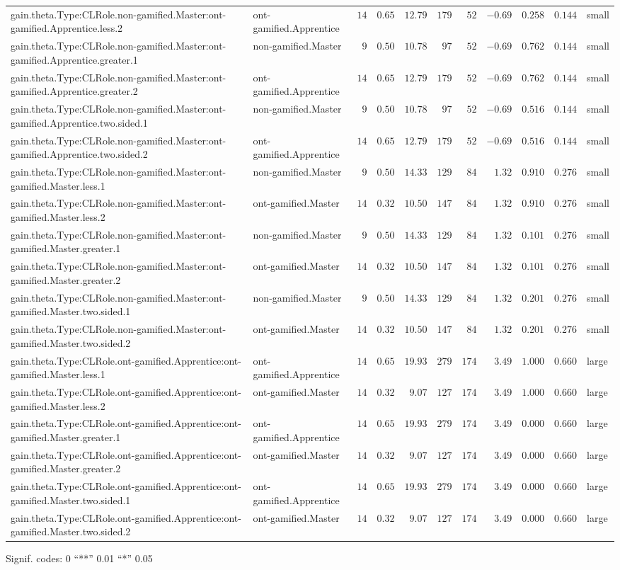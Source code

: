 \documentclass[6pt]{article}
\begin{document}
\begin{landscape}
{\begin{longtable}{llrrrrrrrrl}
gain.theta.Type:CLRole.non-gamified.Master:ont-gamified.Apprentice.less.2&ont-gamified.Apprentice&$14$&$0.65$&$12.79$&$179$&$ 52$&$-0.69$&$0.258$&$0.144$&small\tabularnewline
gain.theta.Type:CLRole.non-gamified.Master:ont-gamified.Apprentice.greater.1&non-gamified.Master&$ 9$&$0.50$&$10.78$&$ 97$&$ 52$&$-0.69$&$0.762$&$0.144$&small\tabularnewline
gain.theta.Type:CLRole.non-gamified.Master:ont-gamified.Apprentice.greater.2&ont-gamified.Apprentice&$14$&$0.65$&$12.79$&$179$&$ 52$&$-0.69$&$0.762$&$0.144$&small\tabularnewline
gain.theta.Type:CLRole.non-gamified.Master:ont-gamified.Apprentice.two.sided.1&non-gamified.Master&$ 9$&$0.50$&$10.78$&$ 97$&$ 52$&$-0.69$&$0.516$&$0.144$&small\tabularnewline
gain.theta.Type:CLRole.non-gamified.Master:ont-gamified.Apprentice.two.sided.2&ont-gamified.Apprentice&$14$&$0.65$&$12.79$&$179$&$ 52$&$-0.69$&$0.516$&$0.144$&small\tabularnewline
gain.theta.Type:CLRole.non-gamified.Master:ont-gamified.Master.less.1&non-gamified.Master&$ 9$&$0.50$&$14.33$&$129$&$ 84$&$ 1.32$&$0.910$&$0.276$&small\tabularnewline
gain.theta.Type:CLRole.non-gamified.Master:ont-gamified.Master.less.2&ont-gamified.Master&$14$&$0.32$&$10.50$&$147$&$ 84$&$ 1.32$&$0.910$&$0.276$&small\tabularnewline
gain.theta.Type:CLRole.non-gamified.Master:ont-gamified.Master.greater.1&non-gamified.Master&$ 9$&$0.50$&$14.33$&$129$&$ 84$&$ 1.32$&$0.101$&$0.276$&small\tabularnewline
gain.theta.Type:CLRole.non-gamified.Master:ont-gamified.Master.greater.2&ont-gamified.Master&$14$&$0.32$&$10.50$&$147$&$ 84$&$ 1.32$&$0.101$&$0.276$&small\tabularnewline
gain.theta.Type:CLRole.non-gamified.Master:ont-gamified.Master.two.sided.1&non-gamified.Master&$ 9$&$0.50$&$14.33$&$129$&$ 84$&$ 1.32$&$0.201$&$0.276$&small\tabularnewline
gain.theta.Type:CLRole.non-gamified.Master:ont-gamified.Master.two.sided.2&ont-gamified.Master&$14$&$0.32$&$10.50$&$147$&$ 84$&$ 1.32$&$0.201$&$0.276$&small\tabularnewline
gain.theta.Type:CLRole.ont-gamified.Apprentice:ont-gamified.Master.less.1&ont-gamified.Apprentice&$14$&$0.65$&$19.93$&$279$&$174$&$ 3.49$&$1.000$&$0.660$&large\tabularnewline
gain.theta.Type:CLRole.ont-gamified.Apprentice:ont-gamified.Master.less.2&ont-gamified.Master&$14$&$0.32$&$ 9.07$&$127$&$174$&$ 3.49$&$1.000$&$0.660$&large\tabularnewline
gain.theta.Type:CLRole.ont-gamified.Apprentice:ont-gamified.Master.greater.1&ont-gamified.Apprentice&$14$&$0.65$&$19.93$&$279$&$174$&$ 3.49$&$0.000$&$0.660$&large\tabularnewline
gain.theta.Type:CLRole.ont-gamified.Apprentice:ont-gamified.Master.greater.2&ont-gamified.Master&$14$&$0.32$&$ 9.07$&$127$&$174$&$ 3.49$&$0.000$&$0.660$&large\tabularnewline
\newpage
gain.theta.Type:CLRole.ont-gamified.Apprentice:ont-gamified.Master.two.sided.1&ont-gamified.Apprentice&$14$&$0.65$&$19.93$&$279$&$174$&$ 3.49$&$0.000$&$0.660$&large\tabularnewline
gain.theta.Type:CLRole.ont-gamified.Apprentice:ont-gamified.Master.two.sided.2&ont-gamified.Master&$14$&$0.32$&$ 9.07$&$127$&$174$&$ 3.49$&$0.000$&$0.660$&large\tabularnewline
\hline
\end{longtable}}\end{landscape}
\begin{flushright}{ \tiny{ Signif. codes:  0 ``**'' 0.01 ``*'' 0.05 }}\end{flushright} 
\end{document}
